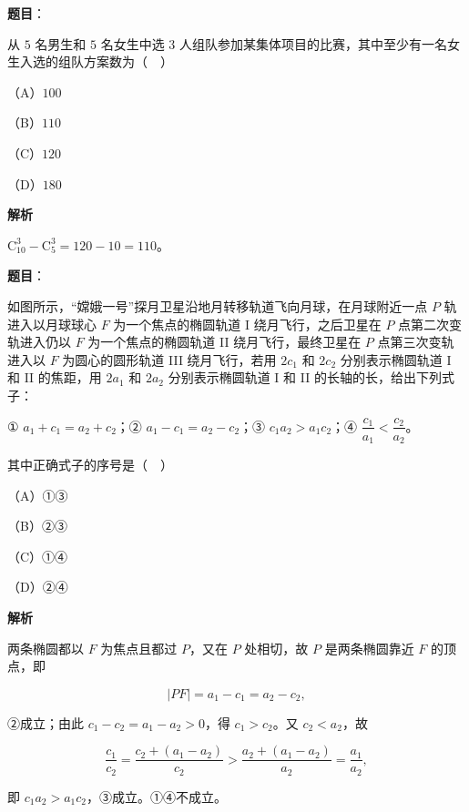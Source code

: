 \begin{answer}

\textbf{题目}：

从 $5$ 名男生和 $5$ 名女生中选 $3$ 人组队参加某集体项目的比赛，其中至少有一名女生入选的组队方案数为（　）

（A）$100$

（B）$110$

（C）$120$

（D）$180$

\textbf{解析}

$\mathrm C_{10}^3-\mathrm C_5^3=120-10=110$。


\end{answer}
\begin{answer}

\textbf{题目}：

如图所示，“嫦娥一号”探月卫星沿地月转移轨道飞向月球，在月球附近一点 $P$ 轨进入以月球球心 $F$ 为一个焦点的椭圆轨道 I 绕月飞行，之后卫星在 $P$ 点第二次变轨进入仍以 $F$ 为一个焦点的椭圆轨道 II 绕月飞行，最终卫星在 $P$ 点第三次变轨进入以 $F$ 为圆心的圆形轨道 III 绕月飞行，若用 $2c_1$ 和 $2c_2$ 分别表示椭圆轨道 I 和 II 的焦距，用 $2a_1$ 和 $2a_2$ 分别表示椭圆轨道 I 和 II 的长轴的长，给出下列式子：

① $a_1+c_1=a_2+c_2$；② $a_1-c_1=a_2-c_2$；③ $c_1a_2>a_1c_2$；④ $\dfrac{c_1}{a_1}<\dfrac{c_2}{a_2}$。

其中正确式子的序号是（　）
\nopagebreak[4]
\begin{center}\end{center}
\nopagebreak[4]
（A）①③

（B）②③

（C）①④

（D）②④

\textbf{解析}

两条椭圆都以 $F$ 为焦点且都过 $P$，又在 $P$ 处相切，故 $P$ 是两条椭圆靠近 $F$ 的顶点，即

\nopagebreak[4]
\[|PF|=a_1-c_1=a_2-c_2,\]

②成立；由此 $c_1-c_2=a_1-a_2>0$，得 $c_1>c_2$。又 $c_2<a_2$，故

\nopagebreak[4]
\[\frac{c_1}{c_2}=\frac{c_2+(a_1-a_2)}{c_2}>\frac{a_2+(a_1-a_2)}{a_2}=\frac{a_1}{a_2},\]

即 $c_1a_2>a_1c_2$，③成立。①④不成立。


\end{answer}
